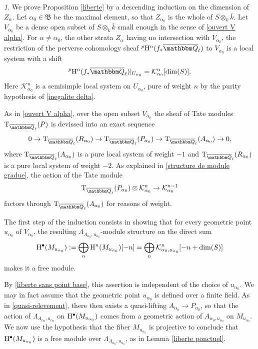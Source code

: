 \documentclass[12pt,english]{smfart}
\numberwithin{equation}{subsection}
\theoremstyle{remark}
\newtheorem{numero}[equation]{}
\newcommand\calK{{\mathcal K}}
\newcommand\rmT{{\rm T}}
\newcommand\FrakB{{\mathfrak B}}
\newcommand\QQ{{\mathbbm Q}}
\newcommand\rmH{{\rm H}}
\newcommand\Ql{{\overline\QQ_\ell}}
\begin{document}
\begin{numero}\label{initialisation recurrence}
We prove Proposition \ref{liberte} by a descending induction on the dimension of $Z_\alpha$. Let $\alpha_0\in\FrakB$ be the maximal element, so that $Z_{\alpha_0}$ is the whole of $S\otimes_k\bar k$. Let $V_{\alpha_0}$ be a dense open subset of $S\otimes_k\bar k$ small enough in the sense of \ref{ouvert V alpha}. For $\alpha\not=\alpha_0$, the other strata $Z_\alpha$ having no intersection with $V_{\alpha_0}$, the restriction of the perverse cohomology sheaf ${}^p\rmH^n(f_*\Ql)$ to $V_{\alpha_0}$ is a local system with a shift
$${}^p\rmH^n(f_*\Ql)|_{U_{\alpha_0}}=\calK^n_{\alpha_0}[\dim(S)].$$
Here $\calK^n_{\alpha_0}$ is a semisimple local system on $U_{\alpha_0}$, pure of weight $n$ by the purity hypothesis of \ref{inegalite delta}.

As in \ref{ouvert V alpha}, over the open subset $V_{\alpha_0}$ the sheaf of Tate modules $\rmT_\Ql(P)$ is devissed into an exact sequence
$$0\rightarrow \rmT_\Ql(R_{\alpha_0})\rightarrow \rmT_\Ql(P_{\alpha_0})\rightarrow \rmT_\Ql(A_{\alpha_0})\rightarrow 0,$$
where $\rmT_\Ql(A_{\alpha_0})$ is a pure local system of weight $-1$ and $\rmT_\Ql(R_{\alpha_0})$ is a pure local system of weight $-2$. As explained in \ref{structure de module gradue}, the action of the Tate module
$$\rmT_\Ql(P_{\alpha_0})\otimes \calK^n_{\alpha_0}\rightarrow \calK^{n-1}_{\alpha_0}$$
factors through $\rmT_\Ql(A_{\alpha_0})$ for reasons of weight.

The first step of the induction consists in showing that for every geometric point $u_{\alpha_0}$ of $V_{\alpha_0}$, the resulting $\Lambda_{A_{\alpha_0},u_{\alpha_0}}$-module structure on the direct sum
$$\rmH^\bullet(M_{u_{\alpha_0}}):=\bigoplus_n \rmH^n(M_{u_{\alpha_0}})[-n]=\bigoplus_n \calK^n_{\alpha_0,u_{\alpha_0}}[-n+\dim(S)]$$
makes it a free module.

By \ref{liberte sans point base}, this assertion is independent of the choice of $u_{\alpha_0}$. We may in fact assume that the geometric point $u_{\alpha_0}$ is defined over a finite field. As in \ref{quasi-relevement}, there then exists a quasi-lifting $A_{\alpha_0}\rightarrow P_{\alpha_0}$, so that the action of $\Lambda_{A_{\alpha_0},u_{\alpha_0}}$ on $\rmH^\bullet(M_{u_{\alpha_0}})$ comes from a geometric action of $A_{\alpha_0,u_{\alpha_0}}$ on $M_{u_{\alpha_0}}$. We now use the hypothesis that the fiber $M_{u_{\alpha_0}}$ is projective to conclude that $\rmH^\bullet(M_{u_{\alpha_0}})$ is a free module over $\Lambda_{A_{\alpha_0},u_{\alpha_0}}$, as in Lemma \ref{liberte ponctuel}.
\end{numero}
\end{document}
